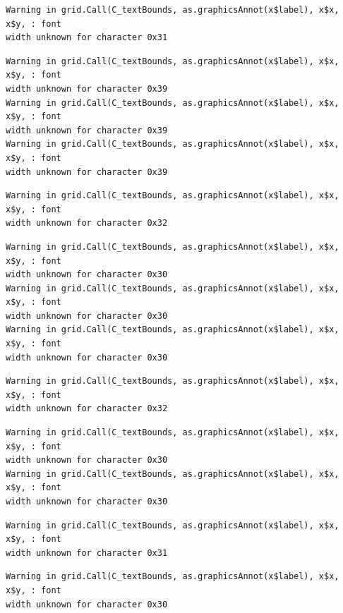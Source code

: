 \documentclass[
  letterpaper,
]{scrbook}
\begin{document}
\begin{verbatim}
Warning in grid.Call(C_textBounds, as.graphicsAnnot(x$label), x$x, x$y, : font
width unknown for character 0x31
\end{verbatim}

\begin{verbatim}
Warning in grid.Call(C_textBounds, as.graphicsAnnot(x$label), x$x, x$y, : font
width unknown for character 0x39
Warning in grid.Call(C_textBounds, as.graphicsAnnot(x$label), x$x, x$y, : font
width unknown for character 0x39
Warning in grid.Call(C_textBounds, as.graphicsAnnot(x$label), x$x, x$y, : font
width unknown for character 0x39
\end{verbatim}

\begin{verbatim}
Warning in grid.Call(C_textBounds, as.graphicsAnnot(x$label), x$x, x$y, : font
width unknown for character 0x32
\end{verbatim}

\begin{verbatim}
Warning in grid.Call(C_textBounds, as.graphicsAnnot(x$label), x$x, x$y, : font
width unknown for character 0x30
Warning in grid.Call(C_textBounds, as.graphicsAnnot(x$label), x$x, x$y, : font
width unknown for character 0x30
Warning in grid.Call(C_textBounds, as.graphicsAnnot(x$label), x$x, x$y, : font
width unknown for character 0x30
\end{verbatim}

\begin{verbatim}
Warning in grid.Call(C_textBounds, as.graphicsAnnot(x$label), x$x, x$y, : font
width unknown for character 0x32
\end{verbatim}

\begin{verbatim}
Warning in grid.Call(C_textBounds, as.graphicsAnnot(x$label), x$x, x$y, : font
width unknown for character 0x30
Warning in grid.Call(C_textBounds, as.graphicsAnnot(x$label), x$x, x$y, : font
width unknown for character 0x30
\end{verbatim}

\begin{verbatim}
Warning in grid.Call(C_textBounds, as.graphicsAnnot(x$label), x$x, x$y, : font
width unknown for character 0x31
\end{verbatim}

\begin{verbatim}
Warning in grid.Call(C_textBounds, as.graphicsAnnot(x$label), x$x, x$y, : font
width unknown for character 0x30
\end{verbatim}
\end{document}

